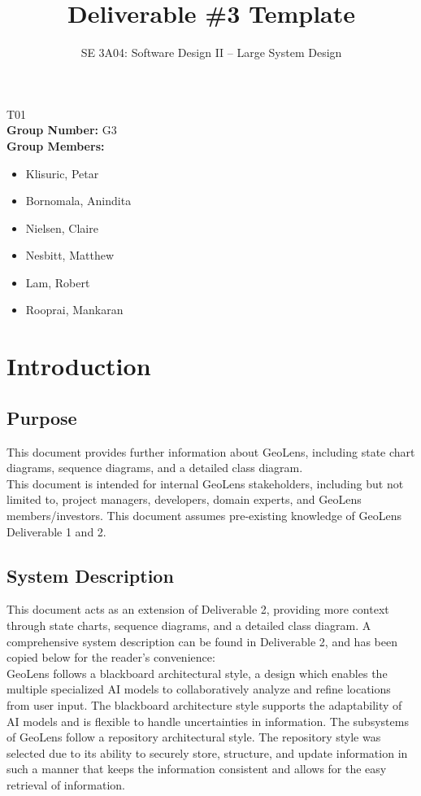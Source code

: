 \documentclass[]{article}
\title{Deliverable \#3 Template}
\author{SE 3A04: Software Design II -- Large System Design}
\date{}
\begin{document}
\maketitle
{} T01\\
{\bf Group Number:} G3 \\
{\bf Group Members:} 
\begin{itemize}
    \item Klisuric, Petar
    \item Bornomala, Anindita
    \item Nielsen, Claire
    \item Nesbitt, Matthew
    \item Lam, Robert 
    \item Rooprai, Mankaran
\end{itemize}


\section{Introduction}
\label{sec:introduction}

\subsection{Purpose}
\label{sub:purpose}
This document provides further information about GeoLens, including state chart diagrams,
sequence diagrams, and a detailed class diagram.\medskip \\
This document is intended for internal GeoLens stakeholders, including but not limited to,
project managers, developers, domain experts, and GeoLens members/investors. This document
assumes pre-existing knowledge of GeoLens Deliverable 1 and 2.

\subsection{System Description}
\label{sub:system_description}
This document acts as an extension of Deliverable 2, providing more context through state charts, sequence diagrams,
and a detailed class diagram. A comprehensive system description can be found in Deliverable 2, and has been copied below
for the reader's convenience:\medskip \\
GeoLens follows a blackboard architectural style, a design which enables the multiple specialized AI models to
collaboratively analyze and refine locations from user input. The blackboard architecture style supports the
adaptability of AI models and is flexible to handle uncertainties in information. The subsystems of GeoLens
follow a repository architectural style. The repository style was selected due to its ability to securely store,
structure, and update information in such a manner that keeps the information consistent and allows for the
easy retrieval of information.
\end{document}
